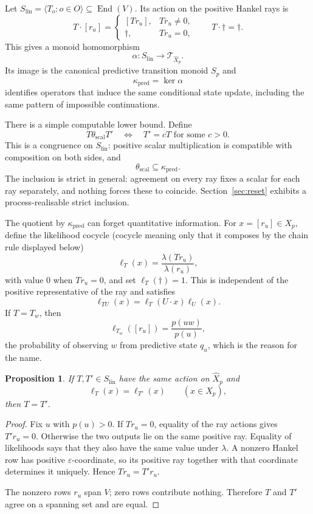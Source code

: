 \documentclass[10pt]{article}
\newtheorem{proposition}[theorem]{Proposition}
\theoremstyle{definition}
\theoremstyle{remark}
\newcommand{\End}{\operatorname{End}}
\newcommand{\Obs}{O}
\newcommand{\eps}{\varepsilon}
\begin{document}
Let $S_{\mathrm{lin}}=\langle T_o:o\in\Obs\rangle\subseteq\End(V)$.  Its action
on the positive Hankel rays is
\[
  T\cdot[r_u]=
  \begin{cases}
    [Tr_u],&Tr_u\ne0,\\
    \dagger,&Tr_u=0,
  \end{cases}
  \qquad T\cdot\dagger=\dagger.
\]
This gives a monoid homomorphism
\[
  \alpha:S_{\mathrm{lin}}\longrightarrow
  \mathcal T_{\widehat X_p}.
\]
Its image is the canonical predictive transition monoid $S_p$ and
\[
  \kappa_{\mathrm{pred}}=\ker\alpha
\]
identifies operators that induce the same conditional state update, including
the same pattern of impossible continuations.

There is a simple computable lower bound.  Define
\[
  T\mathrel{\theta_{\mathrm{scal}}}T'
  \quad\Longleftrightarrow\quad
  T'=cT\text{ for some }c>0.
\]
This is a congruence on $S_{\mathrm{lin}}$: positive scalar multiplication is
compatible with composition on both sides, and
\[
  \theta_{\mathrm{scal}}\subseteq\kappa_{\mathrm{pred}}.
\]
The inclusion is strict in general: agreement on every ray fixes a
scalar for each ray separately, and nothing forces these to coincide.
Section~\ref{sec:reset} exhibits a process-realisable strict
inclusion.

The quotient by $\kappa_{\mathrm{pred}}$ can forget quantitative
information.  For $x=[r_u]\in X_p$, define the likelihood cocycle
(cocycle meaning only that it composes by the chain rule displayed below)
\[
  \ell_T(x)=\frac{\lambda(Tr_u)}{\lambda(r_u)},
\]
with value $0$ when $Tr_u=0$, and set $\ell_T(\dagger)=1$.  This is independent
of the positive representative of the ray and satisfies
\[
  \ell_{TU}(x)=\ell_T(U\cdot x)\ell_U(x).
\]
If $T=T_w$, then
\[
  \ell_{T_w}([r_u])=\frac{p(uw)}{p(u)},
\]
the probability of observing $w$ from predictive state $q_u$, which
is the reason for the name.

\begin{proposition}
\label{prop:faithful}
If $T,T'\in S_{\mathrm{lin}}$ have the same action on $\widehat X_p$ and
\[
  \ell_T(x)=\ell_{T'}(x)
  \qquad(x\in X_p),
\]
then $T=T'$.
\end{proposition}

\begin{proof}
Fix $u$ with $p(u)>0$.  If $Tr_u=0$, equality of the ray actions gives
$T'r_u=0$.  Otherwise the two outputs lie on the same positive ray.  Equality of
likelihoods says that they also have the same value under $\lambda$.  A nonzero
Hankel row has positive $\eps$-coordinate, so its positive ray together with that
coordinate determines it uniquely.  Hence $Tr_u=T'r_u$.

The nonzero rows $r_u$ span $V$; zero rows contribute nothing.  Therefore $T$ and
$T'$ agree on a spanning set and are equal.
\end{proof}
\end{document}
